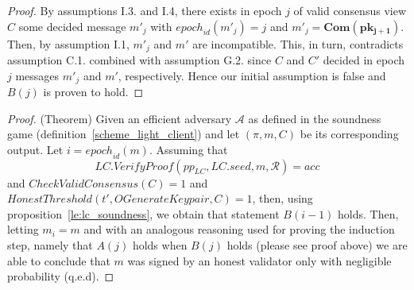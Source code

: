 \begin{proof}
\noindent By assumptions I.3. and I.4, there exists in epoch $j$ of valid consensus view $C$ some decided message $m'_j$ with 
$\mathit{epoch}_{\mathit{id}}(m'_j) = j$ and $m'_j =\mathbf{Com}(\mathbf{pk_{j+1}})$.
Then, by assumption I.1, $m'_j$ and $m'$ are incompatible. This, in turn, contradicts assumption C.1. combined with assumption G.2. 
since $C$ and $C'$ decided in epoch $j$ messages $m'_j$ and $m'$, respectively.
Hence our initial assumption is false and $B(j)$ is proven to hold.
\end{proof}

\begin{proof}(Theorem) Given an efficient adversary $\mathcal{A}$ 
as defined in the soundness game (definition~\ref{scheme_light_client}) and let $(\pi, m, C)$ 
be its corresponding output. Let $i = \mathit{epoch}_{\mathit{id}}(m)$. Assuming that 
$$\mathit{LC.VerifyProof}(\mathit{pp}_{\mathit{LC}}, \mathit{LC.seed}, m, \mathcal{R}) = \mathit{acc}$$ and 
$\mathit{CheckValidConsensus}(C) = 1$ and $\mathit{HonestThreshold}(t', \mathit{OGenerateKeypair}, C) = 1$, 
then, using proposition~\ref{le:lc_soundness}, we obtain that statement $B(i-1)$ holds. Then, letting $m_i = m$ and with an analogous 
reasoning used for proving the induction step, namely that $A(j)$ holds when $B(j)$ holds (please see proof above) we are able to conclude 
that $m$ was signed by an honest validator only with negligible probability (q.e.d).
\end{proof}
